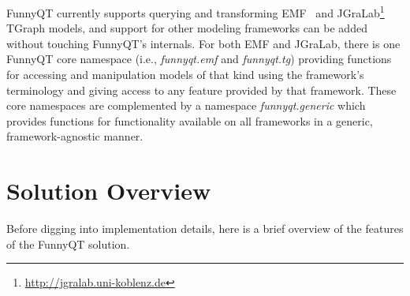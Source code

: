 \documentclass[a4paper]{article}
\begin{document}
FunnyQT currently supports querying and transforming
EMF~\cite{Steinberg2008EEM} and
JGraLab\footnote{\url{http://jgralab.uni-koblenz.de}} TGraph models, and
support for other modeling frameworks can be added without touching FunnyQT's
internals.  For both EMF and JGraLab, there is one FunnyQT core namespace
(i.e., \emph{funnyqt.emf} and \emph{funnyqt.tg}) providing functions for
accessing and manipulation models of that kind using the framework's
terminology and giving access to any feature provided by that framework.  These
core namespaces are complemented by a namespace \emph{funnyqt.generic} which
provides functions for functionality available on all frameworks in a generic,
framework-agnostic manner.


\section{Solution Overview}
\label{sec:solution-overview}

Before digging into implementation details, here is a brief overview of the
features of the FunnyQT solution.
\end{document}
